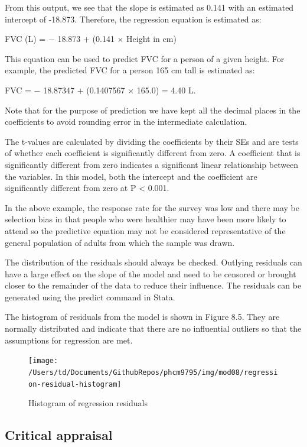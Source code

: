 \documentclass[
]{memoir}
\begin{document}
From this output, we see that the slope is estimated as 0.141 with an estimated intercept of -18.873. Therefore, the regression equation is estimated as:

FVC (L) = − 18.873 + (0.141 \(\times\) Height in cm)

This equation can be used to predict FVC for a person of a given height. For example, the predicted FVC for a person 165 cm tall is estimated as:

FVC = − 18.87347 + (0.1407567 \(\times\) 165.0) = 4.40 L.

Note that for the purpose of prediction we have kept all the decimal places in the coefficients to avoid rounding error in the intermediate calculation.

The t-values are calculated by dividing the coefficients by their SEs and are tests of whether each coefficient is significantly different from zero. A coefficient that is significantly different from zero indicates a significant linear relationship between the variables. In this model, both the intercept and the coefficient are significantly different from zero at P \textless{} 0.001.

In the above example, the response rate for the survey was low and there may be selection bias in that people who were healthier may have been more likely to attend so the predictive equation may not be considered representative of the general population of adults from which the sample was drawn.

The distribution of the residuals should always be checked. Outlying residuals can have a large effect on the slope of the model and need to be censored or brought closer to the remainder of the data to reduce their influence. The residuals can be generated using the predict command in Stata.

The histogram of residuals from the model is shown in Figure 8.5. They are normally distributed and indicate that there are no influential outliers so that the assumptions for regression are met.

\begin{figure}
\texttt{[image: /Users/td/Documents/GithubRepos/phcm9795/img/mod08/regression-residual-histogram]} \caption{Histogram of regression residuals}\label{fig:residual-hist}
\end{figure}

\hypertarget{critical-appraisal}{%
\subsection{Critical appraisal}\label{critical-appraisal}}
\end{document}
